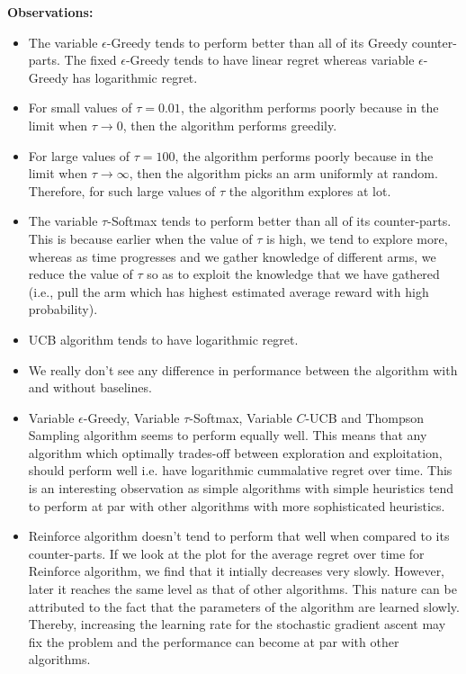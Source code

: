 \documentclass{article}
\begin{document}
		\textbf{Observations:}
		\begin{itemize}
			\item The variable $\epsilon$-Greedy tends to perform better than all of its Greedy counter-parts. The fixed $\epsilon$-Greedy
				tends to have linear regret whereas variable $\epsilon$-Greedy has logarithmic regret. 
			\item For small values of $\tau=0.01$, the algorithm performs poorly because in the limit when $\tau \to 0$, then the algorithm performs greedily.
			\item For large values of $\tau=100$, the algorithm performs poorly because in the limit when $\tau \to \infty$, then the algorithm picks an arm
				uniformly at random. Therefore, for such large values of $\tau$ the algorithm explores at lot.
			\item The variable $\tau$-Softmax tends to perform better than all of its counter-parts. This is because earlier when the value of $\tau$ is high, we
			tend to explore more, whereas as time progresses and we gather knowledge of different arms, we reduce the value of $\tau$ so as to exploit the knowledge
			that we have gathered (i.e., pull the arm which has highest estimated average reward with high probability).
			\item UCB algorithm tends to have logarithmic regret.
			\item We really don't see any difference in performance between the algorithm with and without baselines.
			\item Variable $\epsilon$-Greedy, Variable $\tau$-Softmax, Variable $C$-UCB and Thompson Sampling algorithm seems to perform equally well. This means
				that any algorithm which optimally trades-off between exploration and exploitation, should perform well i.e. have logarithmic cummalative regret over 
				time. This is an interesting observation as simple algorithms with simple heuristics tend to perform at par with other algorithms with more 
				sophisticated heuristics.
			\item Reinforce algorithm doesn't tend to perform that well when compared to its counter-parts. If we look at the plot for the average regret over time
				for Reinforce algorithm, we find that it intially decreases very slowly. However, later it reaches the same level as that of other algorithms. This
				nature can be attributed to the fact that the parameters of the algorithm are learned slowly. Thereby, increasing the learning rate for the 
				stochastic gradient ascent may fix the problem and the performance can become at par with other algorithms.	
		\end{itemize}
		
\end{document}

